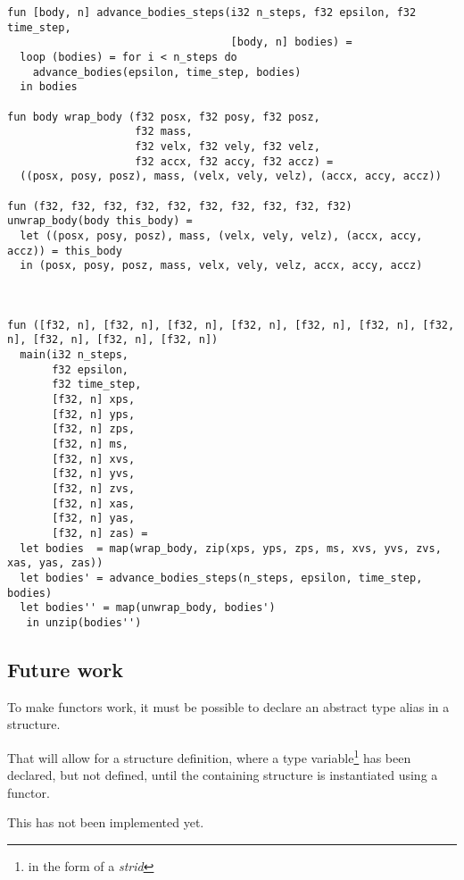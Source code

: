\begin{lstlisting}
fun [body, n] advance_bodies_steps(i32 n_steps, f32 epsilon, f32 time_step,
                                   [body, n] bodies) =
  loop (bodies) = for i < n_steps do
    advance_bodies(epsilon, time_step, bodies)
  in bodies

fun body wrap_body (f32 posx, f32 posy, f32 posz,
                    f32 mass,
                    f32 velx, f32 vely, f32 velz,
                    f32 accx, f32 accy, f32 accz) =
  ((posx, posy, posz), mass, (velx, vely, velz), (accx, accy, accz))

fun (f32, f32, f32, f32, f32, f32, f32, f32, f32, f32) unwrap_body(body this_body) =
  let ((posx, posy, posz), mass, (velx, vely, velz), (accx, accy, accz)) = this_body
  in (posx, posy, posz, mass, velx, vely, velz, accx, accy, accz)



fun ([f32, n], [f32, n], [f32, n], [f32, n], [f32, n], [f32, n], [f32, n], [f32, n], [f32, n], [f32, n])
  main(i32 n_steps,
       f32 epsilon,
       f32 time_step,
       [f32, n] xps,
       [f32, n] yps,
       [f32, n] zps,
       [f32, n] ms,
       [f32, n] xvs,
       [f32, n] yvs,
       [f32, n] zvs,
       [f32, n] xas,
       [f32, n] yas,
       [f32, n] zas) =
  let bodies  = map(wrap_body, zip(xps, yps, zps, ms, xvs, yvs, zvs, xas, yas, zas))
  let bodies' = advance_bodies_steps(n_steps, epsilon, time_step, bodies)
  let bodies'' = map(unwrap_body, bodies')
   in unzip(bodies'')
\end{lstlisting}

\subsection{Future work}
To make functors work, it must be possible to declare an abstract type alias in
a structure.

That will allow for a structure definition, where a type variable\footnote{in
  the form of a \textit{strid}} has been declared, but not defined, until the
containing structure is instantiated using a functor.

This has not been implemented yet.